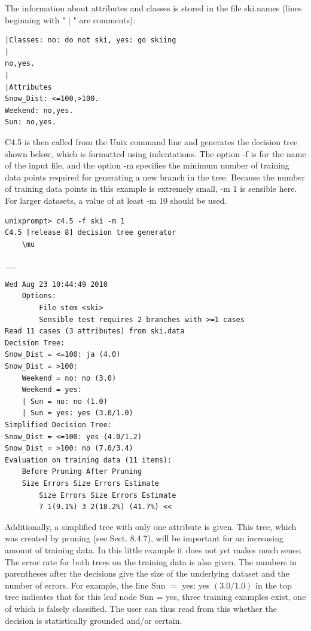 \documentclass[10pt]{article}
\begin{document}
The information about attributes and classes is stored in the file ski.names (lines beginning with " $\mid$ " are comments):

\begin{verbatim}
|Classes: no: do not ski, yes: go skiing
|
no,yes.
|
|Attributes
Snow_Dist: <=100,>100.
Weekend: no,yes.
Sun: no,yes.
\end{verbatim}

C4.5 is then called from the Unix command line and generates the decision tree shown below, which is formatted using indentations. The option -f is for the name of the input file, and the option -m specifies the minimum number of training data points required for generating a new branch in the tree. Because the number of training data points in this example is extremely small, -m 1 is sensible here. For larger datasets, a value of at least -m 10 should be used.

\begin{verbatim}
unixprompt> c4.5 -f ski -m 1
C4.5 [release 8] decision tree generator
    \mu
\end{verbatim}

$\_\_\_\_$

\begin{verbatim}
Wed Aug 23 10:44:49 2010
    Options:
        File stem <ski>
        Sensible test requires 2 branches with >=1 cases
Read 11 cases (3 attributes) from ski.data
Decision Tree:
Snow_Dist = <=100: ja (4.0)
Snow_Dist = >100:
    Weekend = no: no (3.0)
    Weekend = yes:
    | Sun = no: no (1.0)
    | Sun = yes: yes (3.0/1.0)
Simplified Decision Tree:
Snow_Dist = <=100: yes (4.0/1.2)
Snow_Dist = >100: no (7.0/3.4)
Evaluation on training data (11 items):
    Before Pruning After Pruning
    Size Errors Size Errors Estimate
        Size Errors Size Errors Estimate
        7 1(9.1%) 3 2(18.2%) (41.7%) <<
\end{verbatim}

Additionally, a simplified tree with only one attribute is given. This tree, which was created by pruning (see Sect. 8.4.7), will be important for an increasing amount of training data. In this little example it does not yet makes much sense. The error rate for both trees on the training data is also given. The numbers in parentheses after the decisions give the size of the underlying dataset and the number of errors. For example, the line Sun $=$ yes: yes $(3.0 / 1.0)$ in the top tree indicates that for this leaf node Sun = yes, three training examples exist, one of which is falsely classified. The user can thus read from this whether the decision is statistically grounded and/or certain.
\end{document}
